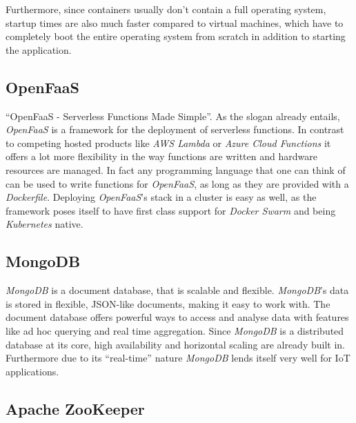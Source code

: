 Furthermore, since containers usually don't contain a full operating system, startup times are also
much faster compared to virtual machines, which have to completely boot the entire operating system
from scratch in addition to starting the application. \cite{docker-container}

\subsection{OpenFaaS}

“OpenFaaS - Serverless Functions Made Simple”. As the slogan already entails, \textit{OpenFaaS} is a
framework for the deployment of serverless functions. In contrast to competing hosted products like
\textit{AWS Lambda} or \textit{Azure Cloud Functions} it offers a lot more flexibility in the way
functions are written and hardware resources are managed. In fact any programming language that one
can think of can be used to write functions for \textit{OpenFaaS}, as long as they are provided with
a \textit{Dockerfile}. Deploying \textit{OpenFaaS}'s stack in a cluster is easy as well, as the
framework poses itself to have first class support for \textit{Docker Swarm} and being
\textit{Kubernetes} native. \cite{openfaas-docs}

\subsection{MongoDB}

\textit{MongoDB} is a document database, that is scalable and flexible. \textit{MongoDB}'s data is
 stored in flexible, JSON-like documents, making it easy to work with. The document database offers
 powerful ways to access and analyse data with features like ad hoc querying and real time
 aggregation. Since \textit{MongoDB} is a distributed database at its core, high availability and
 horizontal scaling are already built in. Furthermore due to its “real-time” nature \textit{MongoDB}
 lends itself very well for IoT applications.  \cite{mongodb-description}

\subsection{Apache ZooKeeper}

